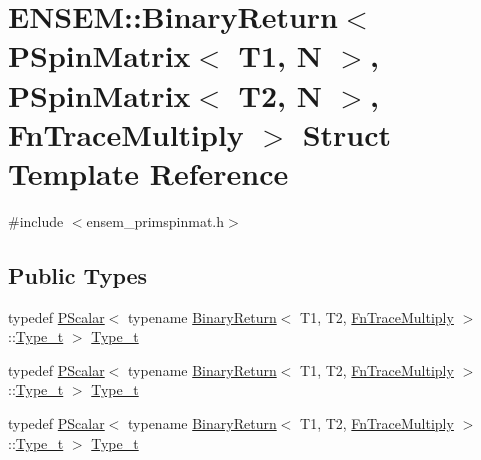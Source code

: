 \hypertarget{structENSEM_1_1BinaryReturn_3_01PSpinMatrix_3_01T1_00_01N_01_4_00_01PSpinMatrix_3_01T2_00_01N_01_4_00_01FnTraceMultiply_01_4}{}\section{E\+N\+S\+EM\+:\+:Binary\+Return$<$ P\+Spin\+Matrix$<$ T1, N $>$, P\+Spin\+Matrix$<$ T2, N $>$, Fn\+Trace\+Multiply $>$ Struct Template Reference}
\label{structENSEM_1_1BinaryReturn_3_01PSpinMatrix_3_01T1_00_01N_01_4_00_01PSpinMatrix_3_01T2_00_01N_01_4_00_01FnTraceMultiply_01_4}


{\ttfamily \#include $<$ensem\+\_\+primspinmat.\+h$>$}

\subsection*{Public Types}
\begin{DoxyCompactItemize}
\item 
typedef \mbox{\hyperlink{classENSEM_1_1PScalar}{P\+Scalar}}$<$ typename \mbox{\hyperlink{structENSEM_1_1BinaryReturn}{Binary\+Return}}$<$ T1, T2, \mbox{\hyperlink{structENSEM_1_1FnTraceMultiply}{Fn\+Trace\+Multiply}} $>$\+::\mbox{\hyperlink{structENSEM_1_1BinaryReturn_3_01PSpinMatrix_3_01T1_00_01N_01_4_00_01PSpinMatrix_3_01T2_00_01N_01_4_00_01FnTraceMultiply_01_4_af60ffd7e2fcfd3d23cf60dbc97969238}{Type\+\_\+t}} $>$ \mbox{\hyperlink{structENSEM_1_1BinaryReturn_3_01PSpinMatrix_3_01T1_00_01N_01_4_00_01PSpinMatrix_3_01T2_00_01N_01_4_00_01FnTraceMultiply_01_4_af60ffd7e2fcfd3d23cf60dbc97969238}{Type\+\_\+t}}
\item 
typedef \mbox{\hyperlink{classENSEM_1_1PScalar}{P\+Scalar}}$<$ typename \mbox{\hyperlink{structENSEM_1_1BinaryReturn}{Binary\+Return}}$<$ T1, T2, \mbox{\hyperlink{structENSEM_1_1FnTraceMultiply}{Fn\+Trace\+Multiply}} $>$\+::\mbox{\hyperlink{structENSEM_1_1BinaryReturn_3_01PSpinMatrix_3_01T1_00_01N_01_4_00_01PSpinMatrix_3_01T2_00_01N_01_4_00_01FnTraceMultiply_01_4_af60ffd7e2fcfd3d23cf60dbc97969238}{Type\+\_\+t}} $>$ \mbox{\hyperlink{structENSEM_1_1BinaryReturn_3_01PSpinMatrix_3_01T1_00_01N_01_4_00_01PSpinMatrix_3_01T2_00_01N_01_4_00_01FnTraceMultiply_01_4_af60ffd7e2fcfd3d23cf60dbc97969238}{Type\+\_\+t}}
\item 
typedef \mbox{\hyperlink{classENSEM_1_1PScalar}{P\+Scalar}}$<$ typename \mbox{\hyperlink{structENSEM_1_1BinaryReturn}{Binary\+Return}}$<$ T1, T2, \mbox{\hyperlink{structENSEM_1_1FnTraceMultiply}{Fn\+Trace\+Multiply}} $>$\+::\mbox{\hyperlink{structENSEM_1_1BinaryReturn_3_01PSpinMatrix_3_01T1_00_01N_01_4_00_01PSpinMatrix_3_01T2_00_01N_01_4_00_01FnTraceMultiply_01_4_af60ffd7e2fcfd3d23cf60dbc97969238}{Type\+\_\+t}} $>$ \mbox{\hyperlink{structENSEM_1_1BinaryReturn_3_01PSpinMatrix_3_01T1_00_01N_01_4_00_01PSpinMatrix_3_01T2_00_01N_01_4_00_01FnTraceMultiply_01_4_af60ffd7e2fcfd3d23cf60dbc97969238}{Type\+\_\+t}}
\end{DoxyCompactItemize}


